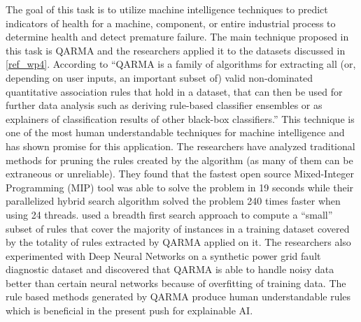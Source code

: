 The goal of this task is to utilize machine intelligence techniques to predict indicators of health for a machine, component, or entire industrial process to determine health and detect premature failure. The main technique proposed in this task is QARMA and the researchers applied it to the datasets discussed in \ref{ref_wp4}. According to \cite{wp5.1} ``QARMA is a family of algorithms for extracting all (or, depending on user inputs, an important subset of) valid non-dominated quantitative association rules that hold in a dataset, that can then be used for further data analysis such as deriving rule-based classifier ensembles or as explainers of classification results of other black-box classifiers.'' This technique is one of the most human understandable techniques for machine intelligence and has shown promise for this application. The researchers have analyzed traditional methods for pruning the rules created by the algorithm (as many of them can be extraneous or unreliable). They found that the fastest open source Mixed-Integer Programming (MIP) tool was able to solve the problem in 19 seconds while their parallelized hybrid search algorithm solved the problem 240 times faster when using 24 threads. \cite{wp5.1} used a breadth first search approach to compute a ``small'' subset of rules that cover the majority of instances in a training dataset covered by the totality of rules extracted by QARMA applied on it. The researchers also experimented with Deep Neural Networks on a synthetic power grid fault diagnostic dataset and discovered that QARMA is able to handle noisy data better than certain neural networks because of overfitting of training data. The rule based methods generated by QARMA produce human understandable rules which is beneficial in the present push for explainable AI.




